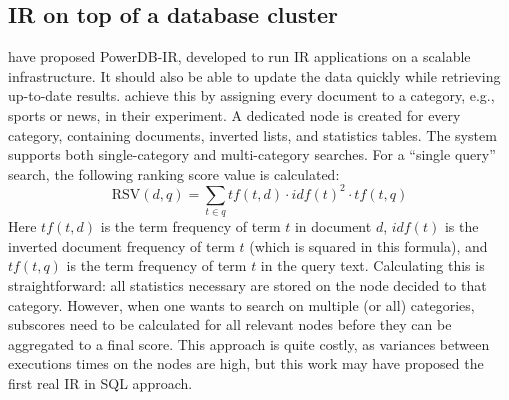 \subsection{IR on top of a database cluster}
 have proposed PowerDB-IR, developed to run IR applications on a scalable infrastructure. It should also be able to update the data quickly while retrieving up-to-date results.  achieve this by assigning every document to a category, e.g., sports or news, in their experiment. A dedicated node is created for every category, containing documents, inverted lists, and statistics tables. 
The system supports both single-category and multi-category searches. For a ``single query'' search, the following ranking score value is calculated:
\begin{equation}
	\text{RSV}(d,q) = \sum_{t\in q} \mathit{tf}(t, d) \cdot \mathit{idf}(t)^2 \cdot \mathit{tf}(t, q)
\end{equation}
Here $\mathit{tf}(t, d)$ is the term frequency of term $t$ in document $d$, $\mathit{idf}(t)$ is the inverted document frequency of term $t$ (which is squared in this formula), and $\mathit{tf}(t, q)$ is the term frequency of term $t$ in the query text. Calculating this is straightforward: all statistics necessary are stored on the node decided to that category. However, when one wants to search on multiple (or all) categories, subscores need to be calculated for all relevant nodes before they can be aggregated to a final score. This approach is quite costly, as variances between executions times on the nodes are high, but this work may have proposed the first real IR in SQL approach. 

